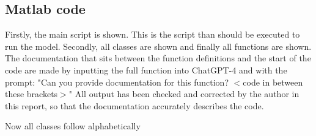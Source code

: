 \begin{appendices}
\section{Matlab code}\label{ap:matlab-code}
Firstly, the main script is shown. This is the script than should be executed to run the model. Secondly, all classes are shown and finally all functions are shown. The documentation that sits between the function definitions and the start of the code are made by inputting the full function into ChatGPT-4 and with the prompt: "Can you provide documentation for this function? $<$code in between these brackets$>$" All output has been checked and corrected by the author in this report, so that the documentation accurately describes the code.

Now all classes follow alphabetically








\end{appendices}
